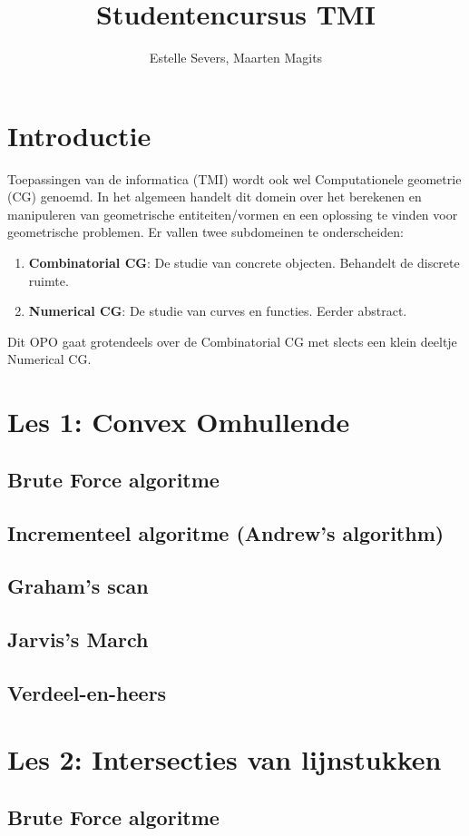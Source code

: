 \documentclass[12pt,a4paper]{article}
\author{Estelle Severs, Maarten Magits}
\title{Studentencursus TMI}
\begin{document}
	\maketitle
	\section{Introductie}
	Toepassingen van de informatica (TMI) wordt ook wel Computationele geometrie (CG) genoemd.
	In het algemeen handelt dit domein over het berekenen en manipuleren van geometrische entiteiten/vormen en een oplossing te vinden voor geometrische problemen.
	Er vallen twee subdomeinen te onderscheiden:
	\begin{enumerate}
		\item \textbf{Combinatorial CG}: De studie van concrete objecten. Behandelt de discrete ruimte.
		\item \textbf{Numerical CG}: De studie van curves en functies. Eerder abstract.
	\end{enumerate}
	Dit OPO gaat grotendeels over de Combinatorial CG met slects een klein deeltje Numerical CG.
	
	\section{Les 1: Convex Omhullende}
	\subsection{Brute Force algoritme}
	\subsection{Incrementeel algoritme 	(Andrew's algorithm)}
	\subsection{Graham's scan}
	\subsection{Jarvis's March}
	\subsection{Verdeel-en-heers}
	\section{Les 2: Intersecties van lijnstukken}
	\subsection{Brute Force algoritme}
\end{document}
